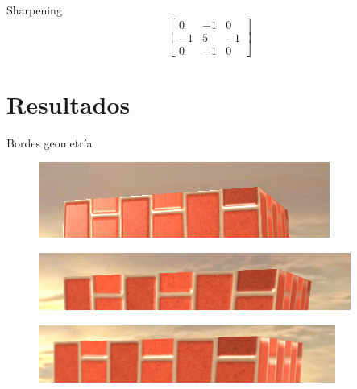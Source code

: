 \documentclass[table]{beamer}
\begin{document}
\begin{frame}[fragile]{Sharpening}
    \[
        \begin{bmatrix}
            0 & -1 & 0 \\
            -1 & 5 & -1 \\
            0 & -1 & 0
        \end{bmatrix}
    \]
\end{frame}

\section{Resultados}

\begin{frame}[fragile]{Bordes geometría}
    \begin{figure}
        \includegraphics[width=.9\linewidth]{./figures/taaoff.png}
    \end{figure}
    \begin{figure}
        \includegraphics[width=.9\linewidth]{./figures/taa8.png}
    \end{figure}
    \begin{figure}
        \includegraphics[width=.9\linewidth]{./figures/taa16.png}
    \end{figure}
\end{frame}
\end{document}
